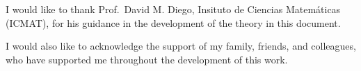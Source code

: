 
\begin{acknowledgements}

I would like to thank Prof.~David M. Diego, Insituto de Ciencias Matemáticas (ICMAT), for his guidance in the development of the theory in this document.

I would also like to acknowledge the support of my family, friends, and colleagues, who have supported me throughout the development of this work.

\end{acknowledgements}


\tableofcontents %

\listoffigures %

\listoftables %



\renewcommand{\lstlistlistingname}{List of Source Code}




